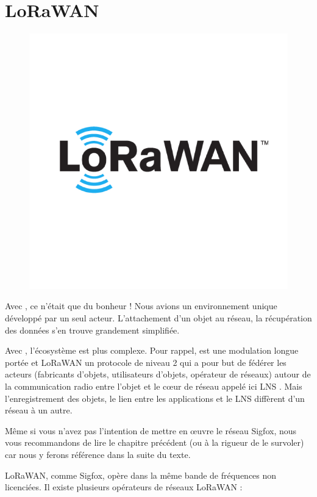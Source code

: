 \cleardoublepage

\chapter{LoRaWAN}


\begin{figure}
\includegraphics[width=.3\columnwidth]{Pictures/LORAWAN-logo.png}
\end{figure}


Avec , ce n’était que du bonheur ! Nous avions un environnement unique développé par un seul acteur. L’attachement d’un objet au réseau, la récupération des données s’en trouve grandement simplifiée.

Avec , l'écosystème est plus complexe. Pour rappel,  est une modulation longue portée et LoRaWAN un protocole de niveau 2 qui a pour but de fédérer les acteurs (fabricants d’objets, utilisateurs d’objets, opérateur de réseaux) autour de la communication radio entre l’objet et le cœur de réseau appelé ici \ac{LNS} . Mais l’enregistrement des objets, le lien entre les applications et le LNS diffèrent d’un réseau à un autre.

     \vspace{1em}

Même si vous n’avez pas l’intention de mettre en œuvre le réseau Sigfox, nous vous recommandons de lire le chapitre précédent (ou à la rigueur de le survoler) car nous y ferons référence dans la suite du texte.

     \vspace{1em}

LoRaWAN, comme Sigfox, opère dans la même bande de fréquences non licenciées. Il existe plusieurs opérateurs de réseaux LoRaWAN :

